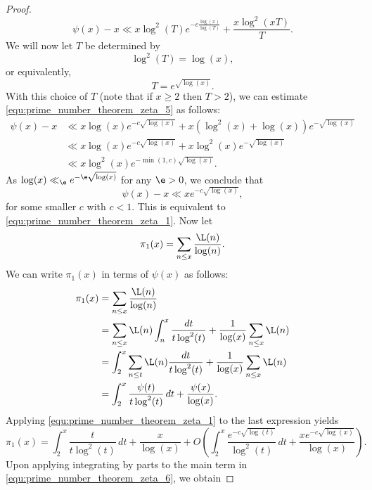 \begin{proof}
        \begin{equation}\label{equ:prime_number_theorem_zeta_5}
          \psi(x)-x \ll x\log^{2}(T)e^{-c\frac{\log(x)}{\log(T)}}+\frac{x\log^{2}(xT)}{T}.
        \end{equation}
        We will now let $T$ be determined by
        \[
          \log^{2}(T) = \log(x),
        \]
        or equivalently,
        \[
          T = e^{\sqrt{\log(x)}}.
        \]
        With this choice of $T$ (note that if $x \ge 2$ then $T > 2$), we can estimate \cref{equ:prime_number_theorem_zeta_5} as follows:
        \begin{align*}
          \psi(x)-x &\ll x\log(x)e^{-c\sqrt{\log(x)}}+x\left(\log^{2}(x)+\log(x)\right)e^{-\sqrt{\log(x)}} \\
          &\ll x\log(x)e^{-c\sqrt{\log(x)}}+x\log^{2}(x)e^{-\sqrt{\log(x)}} \\
          &\ll x\log^{2}(x)e^{-\min(1,c)\sqrt{\log(x)}}.
        \end{align*}
        As $\log(x) \ll_{\e} e^{-\e\sqrt{\log(x)}}$ for any $\e > 0$, we conclude that
        \[
          \psi(x)-x \ll xe^{-c\sqrt{\log(x)}},
        \]
        for some smaller $c$ with $c < 1$. This is equivalent to \cref{equ:prime_number_theorem_zeta_1}. Now let
        \[
          \pi_{1}(x) = \sum_{n \le x}\frac{\L(n)}{\log(n)}.
        \]
        We can write $\pi_{1}(x)$ in terms of $\psi(x)$ as follows:
        \begin{align*}
          \pi_{1}(x) &= \sum_{n \le x}\frac{\L(n)}{\log(n)} \\
          &= \sum_{n \le x}\L(n)\int_{n}^{x}\frac{dt}{t\log^{2}(t)}+\frac{1}{\log(x)}\sum_{n \le x}\L(n) \\
          &= \int_{2}^{x}\sum_{n \le t}\L(n)\frac{dt}{t\log^{2}(t)}+\frac{1}{\log(x)}\sum_{n \le x}\L(n) \\
          &= \int_{2}^{x}\frac{\psi(t)}{t\log^{2}(t)}\,dt+\frac{\psi(x)}{\log(x)}.
        \end{align*}
        Applying \cref{equ:prime_number_theorem_zeta_1} to the last expression yields
        \begin{equation}\label{equ:prime_number_theorem_zeta_6}
          \pi_{1}(x) = \int_{2}^{x}\frac{t}{t\log^{2}(t)}\,dt+\frac{x}{\log(x)}+O\left(\int_{2}^{x}\frac{e^{-c\sqrt{\log(t)}}}{\log^{2}(t)}\,dt+\frac{xe^{-c\sqrt{\log(x)}}}{\log(x)}\right).
        \end{equation}
        Upon applying integrating by parts to the main term in \cref{equ:prime_number_theorem_zeta_6}, we obtain

\end{proof}
